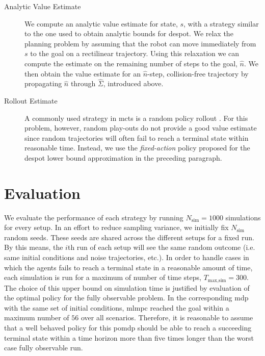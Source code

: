 \begin{description}
  \item[Analytic Value Estimate] We compute an analytic value estimate for
    state, $s$, with a strategy similar to the one used to obtain analytic
    bounds for \ac{despot}. We relax the planning problem by assuming that the
    robot can move immediately from $s$ to the goal on a rectilinear
    trajectory. Using this relaxation we can compute the estimate on the
    remaining number of steps to the goal, $\hat{n}$. We then obtain the value
    estimate for an $\hat{n}$-step, collision-free trajectory by propagating
    $\hat{n}$ through $\hat{\Sigma}$, introduced above.
  \item[Rollout Estimate] A commonly used strategy in \ac{mcts} is a random
    policy rollout \cite{browne2012survey}. For this problem, however, random
    play-outs do not provide a good value estimate since random trajectories
    will often fail to reach a terminal state within reasonable time. Instead,
    we use the \emph{fixed-action} policy proposed for the \ac{despot} lower
    bound approximation in the preceding paragraph.
\end{description}

\section{Evaluation}\label{sec:lp-evaluation}

We evaluate the performance of each strategy by running $N_\text{sim} = 1000$
simulations for every setup. In an effort to reduce sampling variance, we
initially fix $N_\text{sim}$ random seeds. These seeds are shared across the
different setups for a fixed run. By this means, the $i$th run of each setup
will see the same random outcome (i.e. same initial conditions and noise
trajectories, etc.). In order to handle cases in which the agents fails to
reach a terminal state in a reasonable amount of time, each simulation is run
for a maximum of number of time steps, $T_\text{max,sim} = 300$. The choice of
this upper bound on simulation time is justified by evaluation of the optimal
policy for the fully observable problem. In the corresponding \ac{mdp} with the
same set of initial conditions, \ac{mlmpc} reached the goal within a maximum
number of $56$ over all scenarios. Therefore, it is reasonable to assume that
a well behaved policy for this \ac{pomdp} should be able to reach a succeeding
terminal state within a time horizon more than five times longer than the worst
case fully observable run.

